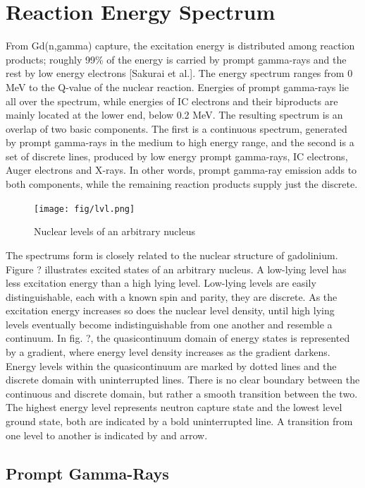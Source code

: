 \section{Reaction Energy Spectrum}
From Gd(n,gamma) capture, the excitation energy is distributed among reaction products; roughly 99\% of the energy is carried by prompt gamma-rays and the rest by low energy electrons [Sakurai et al.]. The energy spectrum ranges from 0 MeV to the Q-value of the nuclear reaction. Energies of prompt gamma-rays lie all over the spectrum, while energies of IC electrons and their biproducts are mainly located at the lower end, below 0.2 MeV.
The resulting spectrum is an overlap of two basic components. The first is a continuous spectrum, generated by prompt gamma-rays in the medium to high energy range, and the second is a set of discrete lines, produced by low energy prompt gamma-rays, IC electrons, Auger electrons and X-rays. In other words, prompt gamma-ray emission adds to both components, while the remaining reaction products supply just the discrete.

  \begin{figure}[h]
  \centering
  	\texttt{[image: fig/lvl.png]}
  	\caption{Nuclear levels of an arbitrary nucleus}
  	\label{fig:1}
  \end{figure}

The spectrums form is closely related to the nuclear structure of gadolinium. Figure ? illustrates excited states of an arbitrary nucleus. A low-lying level has less excitation energy than a high lying level. Low-lying levels are easily distinguishable, each with a known spin and parity, they are discrete. As the excitation energy increases so does the nuclear level density, until high lying levels eventually become indistinguishable from one another and resemble a continuum. In fig. ?, the quasicontinuum domain of energy states is represented by a gradient, where energy level density increases as the gradient darkens. Energy levels within the quasicontinuum are marked by dotted lines and the discrete domain with uninterrupted lines. There is no clear boundary between the continuous and discrete domain, but rather a smooth transition between the two. The highest energy level represents neutron capture state and the lowest level ground state, both are indicated by a bold uninterrupted line. A transition from one level to another is indicated by and arrow.

\subsection{Prompt Gamma-Rays}

